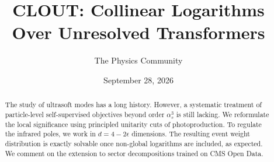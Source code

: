 \documentclass[11pt]{article}
\title{CLOUT: Collinear Logarithms Over Unresolved Transformers}
\author{The Physics Community}
\date{September 28, 2026}
\numberwithin{equation}{section}
\theoremstyle{definition}
\theoremstyle{remark}
\begin{document}
\maketitle
\begin{abstract}
The study of ultrasoft modes has a long history. However, a systematic
treatment of particle-level self-supervised objectives beyond order
$\alpha_s^3$ is still lacking. We reformulate the local significance
using principled unitarity cuts of photoproduction. To regulate the
infrared poles, we work in $d = 4 - 2\epsilon$ dimensions. The resulting
event weight distribution is exactly solvable once non-global logarithms
are included, as expected. We comment on the extension to sector
decompositions trained on CMS Open Data.
\end{abstract}
\tableofcontents





\nocite{*}


\end{document}
